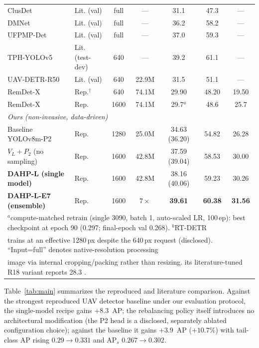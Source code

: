 \documentclass[journal]{IEEEtran}
\newcommand{\ap}{\textup{AP}}
\newcommand{\aps}{\ensuremath{\mathrm{AP}_{s}}}
\newcommand{\remdet}{RemDet-X}
\newcommand{\dahpL}{DAHP-L}
\begin{document}
\begin{table}[!t]
\begin{tabular}{llccccc}
ClusDet \cite{clusdet} & Lit. (val) & full & --- & 31.1 & 47.3 & --- \\
DMNet \cite{dmnet} & Lit. (val) & full & --- & 36.2 & 58.2 & --- \\
UFPMP-Det \cite{ufpmp} & Lit. (val) & full & --- & 37.0 & 59.3 & --- \\
TPH-YOLOv5 \cite{tph} & Lit. (test-dev) & 640 & --- & 39.2 & 61.1 & --- \\
UAV-DETR-R50 \cite{uavdetr} & Lit. (val) & 640 & 22.9M & 31.5 & 51.1 & --- \\
\remdet{} \cite{remdet} & Rep.$^\dagger$ & 640 & 74.1M & 29.90 & 48.20 & 19.50 \\
\remdet{} & Rep. & 1600 & 74.1M & 29.7$^{a}$ & 48.6 & 25.7 \\
\midrule
\multicolumn{7}{l}{\emph{Ours (non-invasive, data-driven)}}\\
Baseline YOLOv8m-P2 & Rep. & 1280 & 25.0M & 34.63 (36.20) & 54.82 & 26.28 \\
$V_L{+}P_2$ (no sampling) & Rep. & 1600 & 42.8M & 37.59 (39.04) & 58.53 & 30.00 \\
\textbf{\dahpL{} (single model)} & Rep. & 1600 & 42.8M & 38.16 (40.06) & 59.23 & 30.26 \\
\textbf{\dahpL{}-E7 (ensemble)} \cite{wbf} & Rep. & 1600 & $7{\times}$ & \textbf{39.61} & \textbf{60.38} & \textbf{31.56} \\
\bottomrule
\multicolumn{7}{l}{\footnotesize $^{a}$compute-matched retrain (single 3090, batch 1, auto-scaled LR, 100\,ep): best checkpoint at epoch 90 (0.297; final-epoch val 0.268). $^{b}$RT-DETR}\\
\multicolumn{7}{l}{\footnotesize trains at an effective 1280\,px despite the 640\,px request (disclosed). ``Input=full'' denotes native-resolution processing}\\
\multicolumn{7}{l}{\footnotesize image via internal cropping/packing rather than resizing. its literature-tuned R18 variant reports 28.3 \cite{rtdetr}.}\\
\end{tabular}
\end{table}

Table~\ref{tab:main} summarizes the reproduced and literature comparison. Against the strongest reproduced UAV detector baseline under our evaluation protocol, the single-model recipe gains $+8.3$~\ap{}; the rebalancing policy itself introduces no architectural modification (the P2 head is a disclosed, separately ablated configuration choice); against the baseline it gains $+3.9$~\ap{} ($+10.7\%$) with tail-class \ap{} rising $0.29{\to}0.331$ and \aps{} $0.267{\to}0.302$.
\end{document}
